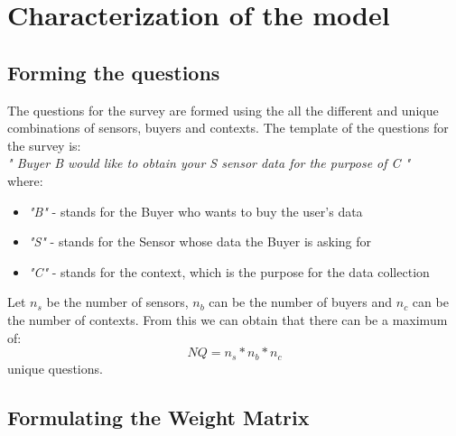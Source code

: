 \section{Characterization of the model}


\subsection{Forming the questions}   \label{question_format}

The questions for the survey are formed using the all the different and unique combinations of sensors, buyers and contexts. The template of the questions for the survey is:\\
{\it " Buyer B would like to obtain your S sensor data for the purpose of C "}\\
where:
\begin{itemize}
\item {\it "B"} - stands for the Buyer who wants to buy the user's data
\item {\it "S"} - stands for the Sensor whose data the Buyer is asking for
\item {\it "C"} - stands for the context, which is the purpose for the data collection
\end{itemize}

Let $n_s$ be the number of sensors, $n_b$ can be the number of buyers and $n_c$ can be the number of contexts. From this we
can obtain that there can be a maximum of:
$$NQ = n_s*n_b*n_c$$ 
unique questions.

\subsection{Formulating the Weight Matrix}  \label{weight_matrix_formulation}

